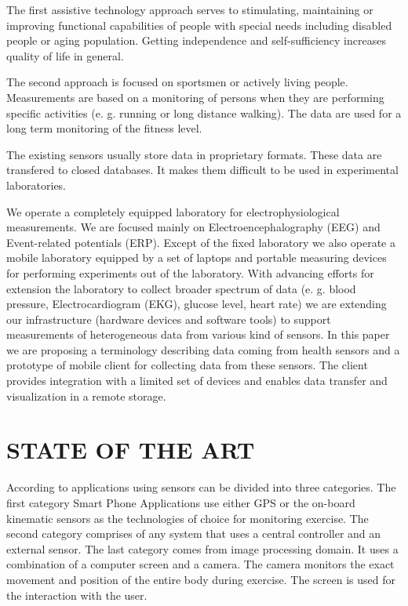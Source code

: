 \documentclass[a4paper,twoside]{article}
\begin{document}
The first assistive technology approach serves to stimulating, maintaining or improving functional capabilities of people with special needs including disabled people or aging population. Getting independence and self-sufficiency increases quality of life in general. 

The second approach is focused on sportsmen or actively living people. Measurements are based on a monitoring of persons when they are performing specific activities (e. g. running or long distance walking). The data are used for a long term monitoring of the fitness level. 

The existing sensors usually store data in proprietary formats. These data are transfered to closed databases. It makes them difficult to be used in experimental laboratories. 

We operate a completely equipped laboratory \cite{10.3389/fninf.2014.00020} for electrophysiological measurements. We are focused  mainly on Electroencephalography (EEG) and Event-related potentials (ERP). Except of the fixed laboratory we also operate a mobile laboratory equipped by a set of laptops and portable measuring devices for performing experiments out of the laboratory. With advancing efforts for extension the laboratory to collect broader spectrum of data (e. g. blood pressure, Electrocardiogram (EKG), glucose level, heart rate) we are extending our infrastructure (hardware devices and software tools) to support  measurements of heterogeneous data from various kind of sensors.  In this paper we are proposing a terminology describing data coming from health sensors and  a prototype of mobile client for collecting data from these sensors. The client provides integration with a limited set of devices and enables data transfer and visualization in a remote storage.

\section{\uppercase{state of the art}}
\label{sec:state-of-the-art}

\noindent
According to \cite{Lowe2012242} applications using sensors can be divided into three categories. The first category Smart Phone Applications use either GPS or the
on-board kinematic sensors as the technologies of choice for monitoring exercise. The second category comprises of any system that uses a central controller
and an external sensor. The last category comes from image processing domain. It uses a combination of a computer screen and a camera. The camera monitors the exact movement and position of the entire body during exercise. The screen is used for the interaction with the user.
\end{document}
